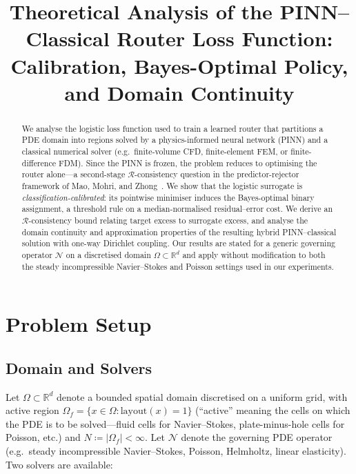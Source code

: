 \documentclass[11pt]{article}
\title{Theoretical Analysis of the PINN--Classical Router Loss Function: \\
Calibration, Bayes-Optimal Policy, and Domain Continuity}
\author{}
\date{}
\newcommand{\R}{\mathbb{R}}
\newcommand{\Rcal}{\mathcal{R}}
\newcommand{\Ncal}{\mathcal{N}}
\begin{document}
\maketitle

\begin{abstract}
We analyse the logistic loss function used to train a learned router that partitions
a PDE domain into regions solved by a physics-informed neural network (PINN) and a
classical numerical solver (e.g.\ finite-volume CFD, finite-element FEM, or
finite-difference FDM).  Since the PINN is frozen, the problem reduces to optimising
the router alone---a second-stage $\Rcal$-consistency question in the
predictor-rejector framework of Mao, Mohri, and Zhong~\cite{mao2024predictor}.  We
show that the logistic surrogate is \emph{classification-calibrated}: its pointwise
minimiser induces the Bayes-optimal binary assignment, a threshold rule on a
median-normalised residual--error cost.  We derive an $\Rcal$-consistency bound
relating target excess to surrogate excess, and analyse the domain continuity and
approximation properties of the resulting hybrid PINN--classical solution with
one-way Dirichlet coupling.  Our results are stated for a generic governing
operator $\Ncal$ on a discretised domain $\Omega \subset \R^d$ and apply
without modification to both the steady incompressible Navier--Stokes and Poisson
settings used in our experiments.
\end{abstract}

\section{Problem Setup}
\label{sec:setup}

\subsection{Domain and Solvers}

Let $\Omega \subset \R^d$ denote a bounded spatial domain discretised on a uniform
grid, with active region $\Omega_f = \{x \in \Omega : \mathrm{layout}(x) = 1\}$
(``active'' meaning the cells on which the PDE is to be solved---fluid cells for
Navier--Stokes, plate-minus-hole cells for Poisson, etc.) and $N \coloneqq |\Omega_f|
< \infty$.  Let $\Ncal$ denote the governing PDE operator (e.g.\ steady
incompressible Navier--Stokes, Poisson, Helmholtz, linear elasticity).  Two
solvers are available:
\end{document}
